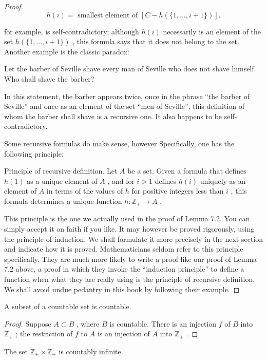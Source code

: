 \begin{theorem}
\begin{proof}
\[
h\left( i\right)  = \text{ smallest element of }\left\lbrack  {C - h\left( {\{ 1,\ldots ,i + 1\} }\right) }\right\rbrack  .
\]

for example, is self-contradictory; although \(h\left( i\right)\) necessarily is an element of the set \(h\left( {\{ 1,\ldots ,i + 1\} }\right)\) , this formula says that it does not belong to the set. Another example is the classic paradox:

Let the barber of Seville shave every man of Seville who does not shave himself. Who shall shave the barber?

In this statement, the barber appears twice, once in the phrase ``the barber of Seville'' and once as an element of the set ``men of Seville'', this definition of whom the barber shall shave is a recursive one. It also happens to be self-contradictory.

Some recursive formulas do make sense, however Specifically, one has the following principle:

Principle of recursive definition. Let \(A\) be a set. Given a formula that defines \(h\left( 1\right)\) as a unique element of \(A\) , and for \(i > 1\) defines \(h\left( i\right)\) uniquely as an element of \(A\) in terms of the values of \(h\) for positive integers less than \(i\) , this formula determines a unique function \(h : {\mathbb{Z}}_{ + } \rightarrow  A\) .

This principle is the one we actually used in the proof of Lemma 7.2. You can simply accept it on faith if you like. It may however be proved rigorously, using the principle of induction. We shall formulate it more precisely in the next section and indicate how it is proved. Mathematicians seldom refer to this principle specifically. They are much more likely to write a proof like our proof of Lemma 7.2 above, a proof in which they invoke the ``induction principle'' to define a function when what they are really using is the principle of recursive definition. We shall avoid undue pedantry in this book by following their example.
\end{proof}
\begin{corollary} A subset of a countable set is countable.
\end{corollary}

\begin{proof}Suppose \(A \subset  B\) , where \(B\) is countable. There is an injection \(f\) of \(B\) into \({\mathbb{Z}}_{ + }\) ; the restriction of \(f\) to \(A\) is an injection of \(A\) into \({\mathbb{Z}}_{ + }\) .\end{proof}
\begin{corollary} The set \({\mathbb{Z}}_{ + } \times  {\mathbb{Z}}_{ + }\) is countably infinite.
\end{corollary}


\end{theorem}
